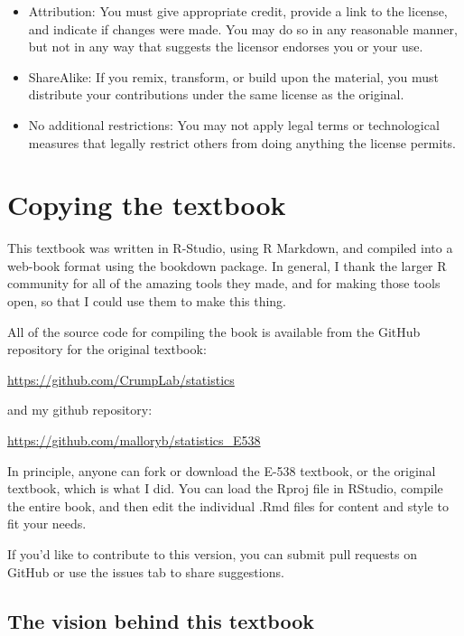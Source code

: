 \documentclass[
  letterpaper,
  DIV=11,
  numbers=noendperiod]{scrreprt}
\providecommand{\tightlist}{%
  \setlength{\itemsep}{0pt}\setlength{\parskip}{0pt}}\usepackage{longtable,booktabs,array}
\begin{document}
\begin{itemize}
\tightlist
\item
  Attribution: You must give appropriate credit, provide a link to the
  license, and indicate if changes were made. You may do so in any
  reasonable manner, but not in any way that suggests the licensor
  endorses you or your use.
\item
  ShareAlike: If you remix, transform, or build upon the material, you
  must distribute your contributions under the same license as the
  original.
\item
  No additional restrictions: You may not apply legal terms or
  technological measures that legally restrict others from doing
  anything the license permits.
\end{itemize}

\section*{Copying the textbook}\label{copying-the-textbook}


This textbook was written in R-Studio, using R Markdown, and compiled
into a web-book format using the bookdown package. In general, I thank
the larger R community for all of the amazing tools they made, and for
making those tools open, so that I could use them to make this thing.

All of the source code for compiling the book is available from the
GitHub repository for the original textbook:

\url{https://github.com/CrumpLab/statistics}

and my github repository:

\url{https://github.com/malloryb/statistics_E538}

In principle, anyone can fork or download the E-538 textbook, or the
original textbook, which is what I did. You can load the Rproj file in
RStudio, compile the entire book, and then edit the individual .Rmd
files for content and style to fit your needs.

If you'd like to contribute to this version, you can submit pull
requests on GitHub or use the issues tab to share suggestions.

\subsection*{The vision behind this
textbook}\label{the-vision-behind-this-textbook}
\end{document}
